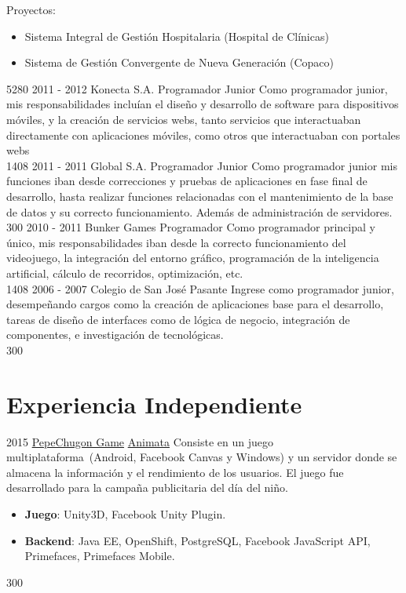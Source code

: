\documentclass[]{friggeri-cv}
\begin{document}
\begin{entrylist}
{        Proyectos:
        \begin{itemize}
            \item Sistema Integral de Gestión Hospitalaria (Hospital de
                Clínicas)
            \item Sistema de Gestión Convergente de Nueva Generación (Copaco)
        \end{itemize}}
    {5280}
\entry
    {2011 - 2012}
    {Konecta S.A.}
    {Programador Junior}
    {Como programador junior, mis responsabilidades incluían el diseño y
        desarrollo de software para dispositivos móviles, y la creación de
        servicios webs, tanto servicios que interactuaban directamente con
        aplicaciones móviles, como otros que interactuaban con portales webs
        \\}
    {1408}
\entry
    {2011 - 2011}
    {Global S.A.}
    {Programador Junior}
    {Como programador junior mis funciones iban desde correcciones y pruebas de
        aplicaciones en fase final de desarrollo, hasta realizar funciones
        relacionadas con el mantenimiento de la base de datos y su correcto
        funcionamiento. Además de administración de servidores. \\}
    {300}
\entry
    {2010 - 2011}
    {Bunker Games}
    {Programador}
    {Como programador principal y único, mis responsabilidades iban desde la
        correcto funcionamiento del videojuego, la integración del entorno
        gráfico, programación de la inteligencia artificial, cálculo de
        recorridos, optimización, etc. \\}
    {1408}
\entry
    {2006 - 2007}
    {Colegio de San José}
    {Pasante}
    {Ingrese como programador junior, desempeñando cargos como la
creación de aplicaciones base para el desarrollo, tareas de diseño de
interfaces como de lógica de negocio, integración de componentes, e
investigación de tecnológicas. \\}
    {300}

\end{entrylist}

\section{Experiencia Independiente}
\proyectof
    {2015}
    {\href{https://apps.facebook.com/pechugon_pepe}{PepeChugon Game}}
    {\href{http://www.animata.com.py/}{Animata}}
    {Consiste en un juego multiplataforma~(Android, Facebook Canvas y Windows)
        y un servidor donde se almacena la información y el rendimiento de los
        usuarios. El juego fue desarrollado para la campaña publicitaria del día
        del niño.}
    {\begin{itemize}
            \item \textbf{Juego}: Unity3D, Facebook Unity Plugin.
            \item \textbf{Backend}: Java EE, OpenShift, PostgreSQL, Facebook
                JavaScript API, Primefaces, Primefaces Mobile.
        \end{itemize}}
    {300}
        
\end{document}
